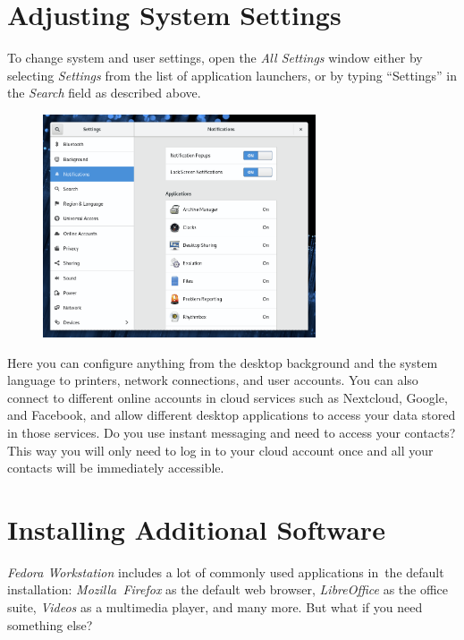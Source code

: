 \section*{Adjusting System Settings}

To change system and user settings, open the \emph{All Settings} window either by selecting \emph{Settings} from the list of application launchers, or by typing \enquote{Settings} in the \emph{Search} field as described above.

\begin{figure}[tbp]
\begin{center}
\includegraphics[width=0.72\textwidth]{img/settings}
 \label{fig:settings}
\end{center}
\end{figure}

Here you can configure anything from the desktop background and the system language to printers, network connections, and user accounts. You can also connect to different online accounts in cloud services such as Nextcloud, Google, and Facebook, and allow different desktop applications to access your data stored in those services. Do you use instant messaging and need to access your contacts? This way you will only need to log in to your cloud account once and all your contacts will be immediately accessible.

\section*{Installing Additional Software}\label{installing_additional_software}

\emph{Fedora Workstation} includes a lot of commonly used applications in~the default installation: \emph{Mozilla~Firefox} as the default web browser, \emph{LibreOffice} as the office suite, \emph{Videos} as a multimedia player, and many more. But what if you need something else?

